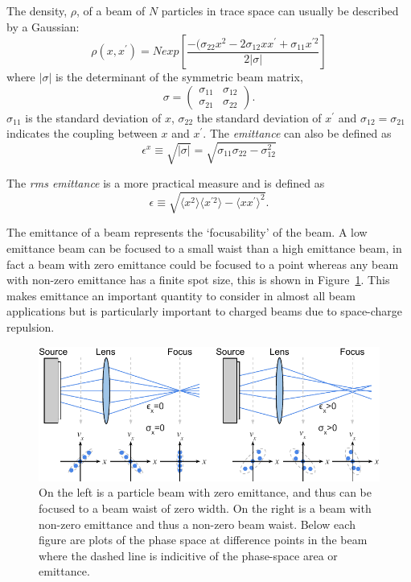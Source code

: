 The density, $\rho$, of a beam of $N$ particles in trace space can usually be described by a Gaussian:
\begin{equation}\label{trace_space_density}
\rho(x, x^\prime) = N exp\left[ \frac{-(\sigma_{22}x^2-2\sigma_{12}xx^\prime+\sigma_{11}x^{\prime2}}{2|\sigma|} \right]
\end{equation}
where $|\sigma|$ is the determinant of the symmetric beam matrix,
\begin{equation}
\sigma = \begin{pmatrix} \sigma_{11} & \sigma_{12} \\ \sigma_{21} & \sigma_{22} \end{pmatrix}.
\end{equation}
$\sigma_{11}$ is the standard deviation of $x$, $\sigma_{22}$ the standard deviation of $x^\prime$ and $\sigma_{12}=\sigma_{21}$ indicates the coupling between $x$ and $x^\prime$. The \emph{emittance} can also be defined as
\begin{equation}\label{eq:emittancewithdeterminant}
\epsilon^x \equiv \sqrt{|\sigma|} = \sqrt{\sigma_{11}\sigma_{22}-\sigma_{12}^2}
\end{equation}

The \emph{\gls{rms} emittance} is a more practical measure and is defined as
\begin{equation}\label{emittance}
\epsilon \equiv \sqrt{\langle x^2\rangle \langle x^{\prime 2}\rangle - \langle x x^\prime\rangle^2}.
\end{equation}

The emittance of a beam represents the `focusability' of the beam.
A low emittance beam can be focused to a small waist than a high emittance beam, in fact a beam with zero emittance could be focused to a point whereas any beam with non-zero emittance has a finite spot size, this is shown in Figure~\ref{figure:focusability}.
This makes emittance an important quantity to consider in almost all beam applications but is particularly important to charged beams due to space-charge repulsion.

\begin{figure}
\center
\includegraphics{part2/Figs/EmittanceFocasability.pdf}
\caption{On the left is a particle beam with zero emittance, and thus can be focused to a beam waist of zero width. On the right is a beam with non-zero emittance and thus a non-zero beam waist. Below each figure are plots of the phase space at difference points in the beam where the dashed line is indicitive of the phase-space area or emittance.}
\label{figure:focusability}
\end{figure}

